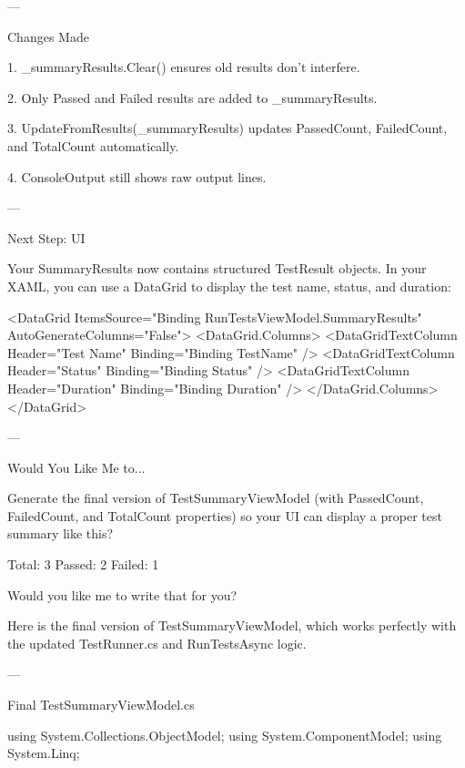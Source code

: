 ---

Changes Made

1. _summaryResults.Clear() ensures old results don’t interfere.


2. Only Passed and Failed results are added to _summaryResults.


3. UpdateFromResults(_summaryResults) updates PassedCount, FailedCount, and TotalCount automatically.


4. ConsoleOutput still shows raw output lines.




---

Next Step: UI

Your SummaryResults now contains structured TestResult objects.
In your XAML, you can use a DataGrid to display the test name, status, and duration:

<DataGrid ItemsSource="{Binding RunTestsViewModel.SummaryResults}" AutoGenerateColumns="False">
    <DataGrid.Columns>
        <DataGridTextColumn Header="Test Name" Binding="{Binding TestName}" />
        <DataGridTextColumn Header="Status" Binding="{Binding Status}" />
        <DataGridTextColumn Header="Duration" Binding="{Binding Duration}" />
    </DataGrid.Columns>
</DataGrid>


---

Would You Like Me to...

Generate the final version of TestSummaryViewModel (with PassedCount, FailedCount, and TotalCount properties) so your UI can display a proper test summary like this?

Total: 3
Passed: 2
Failed: 1

Would you like me to write that for you?




Here is the final version of TestSummaryViewModel, which works perfectly with the updated TestRunner.cs and RunTestsAsync logic.


---

Final TestSummaryViewModel.cs

using System.Collections.ObjectModel;
using System.ComponentModel;
using System.Linq;

